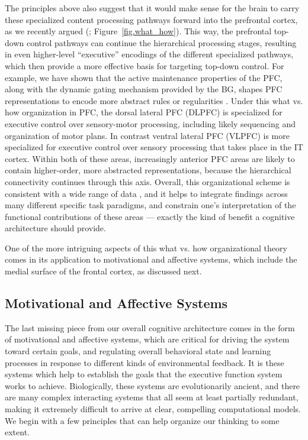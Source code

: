 \documentclass[11pt,twoside]{article}
\begin{document}
The principles above also suggest that it would make sense for the brain to
carry these specialized content processing pathways forward into the
prefrontal cortex, as we recently argued (;
Figure~\ref{fig.what_how}).  This way, the prefrontal top-down control
pathways can continue the hierarchical processing stages, resulting in even
higher-level ``executive'' encodings of the different specialized pathways,
which then provide a more effective basis for targeting top-down control.  For
example, we have shown that the active maintenance properties of the PFC,
along with the dynamic gating mechanism provided by the BG, shapes PFC
representations to encode more abstract rules or regularities
\cite{RougierNoelleBraverEtAl05}.  Under this what vs. how organization in
PFC, the dorsal lateral PFC (DLPFC) is specialized for executive control over
sensory-motor processing, including likely sequencing and organization of
motor plans.  In contrast ventral lateral PFC (VLPFC) is more specialized for
executive control over sensory processing that takes place in the IT cortex.
Within both of these areas, increasingly anterior PFC areas are likely to
contain higher-order, more abstracted representations, because the
hierarchical connectivity continues through this axis.  Overall, this
organizational scheme is consistent with a wide range of data
\cite{OReilly10}, and it helps to integrate findings across many different
specific task paradigms, and constrain one's interpretation of the functional
contributions of these areas --- exactly the kind of benefit a cognitive
architecture should provide.

One of the more intriguing aspects of this what vs. how organizational theory
comes in its application to motivational and affective systems, which include
the medial surface of the frontal cortex, as discussed next.

\subsection{Motivational and Affective Systems}


The last missing piece from our overall cognitive architecture comes in the
form of motivational and affective systems, which are critical for driving the
system toward certain goals, and regulating overall behavioral state and
learning processes in response to different kinds of environmental feedback.
It is these systems which help to establish the goals that the executive
function system works to achieve.  Biologically, these systems are
evolutionarily ancient, and there are many complex interacting systems that
all seem at least partially redundant, making it extremely difficult to arrive
at clear, compelling computational models.  We begin with a few principles
that can help organize our thinking to some extent.
\end{document}
